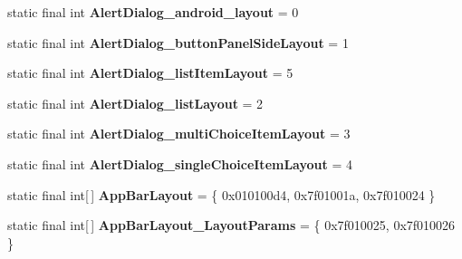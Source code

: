 \begin{DoxyCompactItemize}
\item 
\hypertarget{classandroid_1_1support_1_1design_1_1_r_1_1styleable_a71bc85e6ec9ee647058ddec18999bc91}{}static final int {\bfseries Alert\+Dialog\+\_\+android\+\_\+layout} = 0\label{classandroid_1_1support_1_1design_1_1_r_1_1styleable_a71bc85e6ec9ee647058ddec18999bc91}

\item 
\hypertarget{classandroid_1_1support_1_1design_1_1_r_1_1styleable_a409ae73aecd7c9e5a57bc54add92d3ce}{}static final int {\bfseries Alert\+Dialog\+\_\+button\+Panel\+Side\+Layout} = 1\label{classandroid_1_1support_1_1design_1_1_r_1_1styleable_a409ae73aecd7c9e5a57bc54add92d3ce}

\item 
\hypertarget{classandroid_1_1support_1_1design_1_1_r_1_1styleable_a65581c0e854793dd465d4fd5571d102e}{}static final int {\bfseries Alert\+Dialog\+\_\+list\+Item\+Layout} = 5\label{classandroid_1_1support_1_1design_1_1_r_1_1styleable_a65581c0e854793dd465d4fd5571d102e}

\item 
\hypertarget{classandroid_1_1support_1_1design_1_1_r_1_1styleable_a8fafa3e0c1cdb4161960369a508c8a96}{}static final int {\bfseries Alert\+Dialog\+\_\+list\+Layout} = 2\label{classandroid_1_1support_1_1design_1_1_r_1_1styleable_a8fafa3e0c1cdb4161960369a508c8a96}

\item 
\hypertarget{classandroid_1_1support_1_1design_1_1_r_1_1styleable_a77a0dbf6bd7bd9b4f3b521a0e75826b5}{}static final int {\bfseries Alert\+Dialog\+\_\+multi\+Choice\+Item\+Layout} = 3\label{classandroid_1_1support_1_1design_1_1_r_1_1styleable_a77a0dbf6bd7bd9b4f3b521a0e75826b5}

\item 
\hypertarget{classandroid_1_1support_1_1design_1_1_r_1_1styleable_a3740e6ae8888268dd6b9ed155ea53f8e}{}static final int {\bfseries Alert\+Dialog\+\_\+single\+Choice\+Item\+Layout} = 4\label{classandroid_1_1support_1_1design_1_1_r_1_1styleable_a3740e6ae8888268dd6b9ed155ea53f8e}

\item 
\hypertarget{classandroid_1_1support_1_1design_1_1_r_1_1styleable_ad4af8881949a584d986f4bfadb3e8482}{}static final int\mbox{[}$\,$\mbox{]} {\bfseries App\+Bar\+Layout} = \{ 0x010100d4, 0x7f01001a, 0x7f010024 \}\label{classandroid_1_1support_1_1design_1_1_r_1_1styleable_ad4af8881949a584d986f4bfadb3e8482}

\item 
\hypertarget{classandroid_1_1support_1_1design_1_1_r_1_1styleable_af35cb615b571fb6d447bc930baeae71d}{}static final int\mbox{[}$\,$\mbox{]} {\bfseries App\+Bar\+Layout\+\_\+\+Layout\+Params} = \{ 0x7f010025, 0x7f010026 \}\label{classandroid_1_1support_1_1design_1_1_r_1_1styleable_af35cb615b571fb6d447bc930baeae71d}


\end{DoxyCompactItemize}
